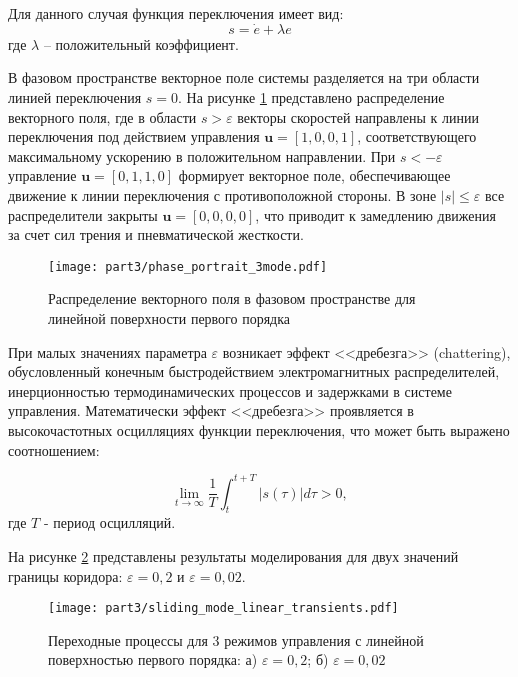 Для данного случая функция переключения имеет вид:
\begin{equation*}
s = \dot{e} + \lambda e
\end{equation*}
где $\lambda$ -- положительный коэффициент.

В фазовом пространстве векторное поле системы разделяется на три области линией
переключения $s = 0$. На рисунке \ref{fig:vector_field_linear} представлено
распределение векторного поля, где в области $s > \varepsilon$ векторы
скоростей направлены к линии переключения под действием
управления $\mathbf{u} = [1,0,0,1]$, соответствующего максимальному ускорению в положительном
направлении. При $s < -\varepsilon$ управление $\mathbf{u} = [0,1,1,0]$ формирует
векторное поле, обеспечивающее движение к линии переключения с противоположной
стороны. В зоне $|s| \leq \varepsilon$ все распределители закрыты $\mathbf{u} = [0,0,0,0]$,
что приводит к замедлению движения за счет сил трения и пневматической жесткости.
\begin{figure}[h]
\centering
\texttt{[image: part3/phase\_portrait\_3mode.pdf]}
\caption{Распределение векторного поля в фазовом пространстве для линейной поверхности первого порядка}
\label{fig:vector_field_linear}
\end{figure}

При малых значениях параметра $\varepsilon$ возникает эффект <<дребезга>> (chattering),
обусловленный конечным быстродействием электромагнитных распределителей,
инерционностью термодинамических процессов и задержками в системе управления.
Математически эффект <<дребезга>> проявляется в высокочастотных осцилляциях функции
переключения, что может быть выражено соотношением:

\begin{equation*}
\lim_{t \to \infty} \frac{1}{T}\int_t^{t+T} |s(\tau)| d\tau > 0,
\end{equation*}
где $T$ - период осцилляций.

На рисунке \ref{fig:ch3:transient_comparison_linear_mode3} представлены результаты моделирования
для двух значений границы коридора: $\varepsilon = 0,2$ и $\varepsilon = 0,02$.

\begin{figure}[h]
\centering
\texttt{[image: part3/sliding\_mode\_linear\_transients.pdf]}
\caption{Переходные процессы для 3 режимов управления с линейной поверхностью первого порядка:
а) $\varepsilon = 0,2$; б) $\varepsilon = 0,02$}
\label{fig:ch3:transient_comparison_linear_mode3}
\end{figure}

